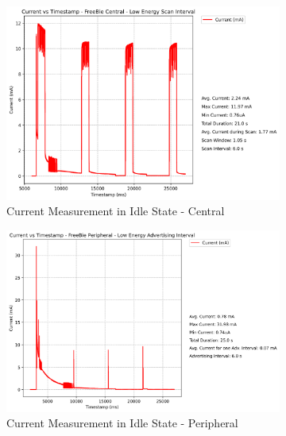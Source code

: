 \begin{figure}[H]
    \begin{subfigure}{0.5\linewidth}
        \centering
        \includegraphics[width=0.8\linewidth]{chapters/Results/Current vs Timestamp - FreeBie Central Low.png}
        \caption{Current Measurement in Idle State - Central}
        \label{fig:freebie_low_central}
    \end{subfigure}
    \begin{subfigure}{0.5\linewidth}
        \centering
        \includegraphics[width=0.8\linewidth]{chapters/Results/Current vs Timestamp - FreeBie Peripheral Low.png}
        \caption{Current Measurement in Idle State - Peripheral}
        \label{fig:freebie_low_peripheral}
    \end{subfigure}
    \begin{center}
        \begin{subfigure}{0.5\linewidth}
            \centering

\end{subfigure}
\end{center}
\end{figure}
